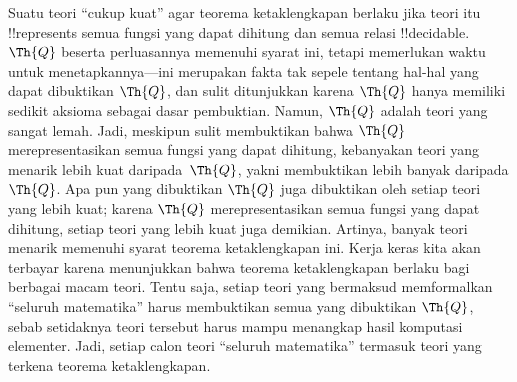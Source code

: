 \documentclass[../../../include/open-logic-section]{subfiles}
\begin{document}
Suatu teori ``cukup kuat'' agar teorema ketaklengkapan berlaku jika teori itu
!!{represents} semua fungsi yang dapat dihitung dan semua relasi
!!{decidable}. $\Th{Q}$ beserta perluasannya memenuhi syarat ini, tetapi
memerlukan waktu untuk menetapkannya---ini merupakan fakta tak sepele tentang
hal-hal yang dapat dibuktikan $\Th{Q}$, dan sulit ditunjukkan karena $\Th{Q}$
hanya memiliki sedikit aksioma sebagai dasar pembuktian. Namun, $\Th{Q}$
adalah teori yang sangat lemah. Jadi, meskipun sulit membuktikan bahwa
$\Th{Q}$ merepresentasikan semua fungsi yang dapat dihitung, kebanyakan teori
yang menarik lebih kuat daripada~$\Th{Q}$, yakni membuktikan lebih banyak
daripada $\Th{Q}$. Apa pun yang dibuktikan $\Th{Q}$ juga dibuktikan oleh
setiap teori yang lebih kuat; karena $\Th{Q}$ merepresentasikan semua fungsi
yang dapat dihitung, setiap teori yang lebih kuat juga demikian. Artinya,
banyak teori menarik memenuhi syarat teorema ketaklengkapan ini. Kerja keras
kita akan terbayar karena menunjukkan bahwa teorema ketaklengkapan berlaku
bagi berbagai macam teori. Tentu saja, setiap teori yang bermaksud
memformalkan ``seluruh matematika'' harus membuktikan semua yang dibuktikan
$\Th{Q}$, sebab setidaknya teori tersebut harus mampu menangkap hasil
komputasi elementer. Jadi, setiap calon teori ``seluruh matematika'' termasuk
teori yang terkena teorema ketaklengkapan.
\end{document}
